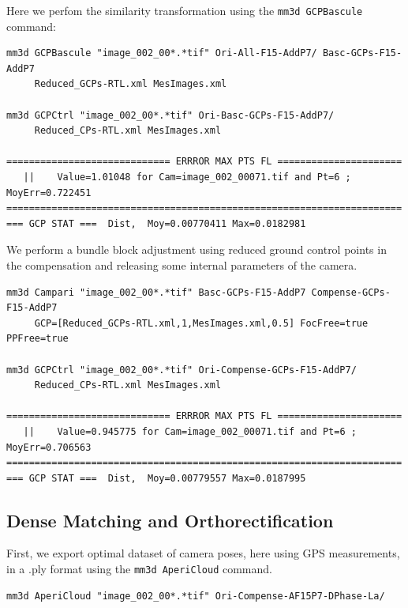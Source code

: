 Here we perfom the similarity transformation using the {\tt mm3d GCPBascule} command:

\begin{verbatim}
mm3d GCPBascule "image_002_00*.*tif" Ori-All-F15-AddP7/ Basc-GCPs-F15-AddP7 
     Reduced_GCPs-RTL.xml MesImages.xml
     
mm3d GCPCtrl "image_002_00*.*tif" Ori-Basc-GCPs-F15-AddP7/ 
     Reduced_CPs-RTL.xml MesImages.xml

============================= ERRROR MAX PTS FL ======================
   ||    Value=1.01048 for Cam=image_002_00071.tif and Pt=6 ; MoyErr=0.722451
======================================================================
=== GCP STAT ===  Dist,  Moy=0.00770411 Max=0.0182981
\end{verbatim}


We perform a bundle block adjustment using reduced ground control points in the compensation and releasing some internal parameters of the camera.

\begin{verbatim}
mm3d Campari "image_002_00*.*tif" Basc-GCPs-F15-AddP7 Compense-GCPs-F15-AddP7 
     GCP=[Reduced_GCPs-RTL.xml,1,MesImages.xml,0.5] FocFree=true PPFree=true
     
mm3d GCPCtrl "image_002_00*.*tif" Ori-Compense-GCPs-F15-AddP7/ 
     Reduced_CPs-RTL.xml MesImages.xml

============================= ERRROR MAX PTS FL ======================
   ||    Value=0.945775 for Cam=image_002_00071.tif and Pt=6 ; MoyErr=0.706563
======================================================================
=== GCP STAT ===  Dist,  Moy=0.00779557 Max=0.0187995
\end{verbatim}


\subsection{Dense Matching and Orthorectification}
First, we export optimal dataset of camera poses, here using GPS measurements, in a .ply format using the {\tt mm3d AperiCloud} command.
\begin{verbatim}
mm3d AperiCloud "image_002_00*.*tif" Ori-Compense-AF15P7-DPhase-La/
\end{verbatim}


